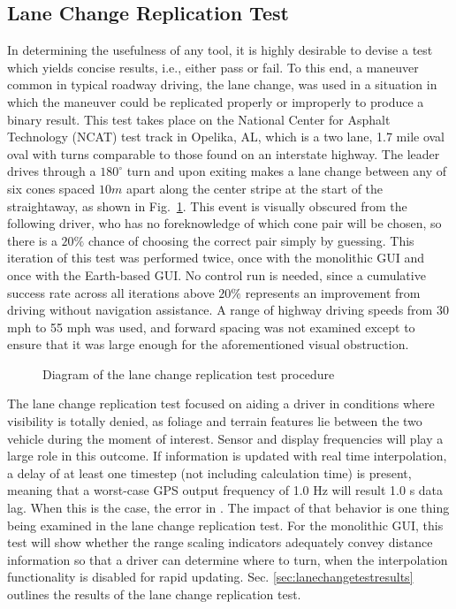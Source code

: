 \subsection{Lane Change Replication Test} \label{sec:lanechangetest}
In determining the usefulness of any tool, it is highly desirable to devise a test which yields concise results, i.e., either pass or fail. To this end, a maneuver common in typical roadway driving, the lane change, was used in a situation in which the maneuver could be replicated properly or improperly to produce a binary result. This test takes place on the National Center for Asphalt Technology (NCAT) test track in Opelika, AL, which is a two lane, 1.7 mile oval oval with turns comparable to those found on an interstate highway. The leader drives through a $180^\circ$ turn and upon exiting makes a lane change between any of six cones spaced $10m$ apart along the center stripe at the start of the straightaway, as shown in Fig.~\ref{fig:lanechangediagram}. This event is visually obscured from the following driver, who has no foreknowledge of which cone pair will be chosen, so there is a $20\%$ chance of choosing the correct pair simply by guessing. This iteration of this test was performed twice, once with the monolithic GUI and once with the Earth-based GUI. No control run is needed, since a cumulative success rate across all iterations above $20\%$ represents an improvement from driving without navigation assistance. A range of highway driving speeds from 30 mph to 55 mph was used, and forward spacing was not examined except to ensure that it was large enough for the aforementioned visual obstruction.

\begin{figure}[ht] \centering
    
    \caption{Diagram of the lane change replication test procedure} \label{fig:lanechangediagram}
\end{figure}

The lane change replication test focused on aiding a driver in conditions where visibility is totally denied, as foliage and terrain features lie between the two vehicle during the moment of interest. Sensor and display frequencies will play a large role in this outcome. If information is updated with real time interpolation, a delay of at least one timestep (not including calculation time) is present, meaning that a worst-case GPS output frequency of 1.0 Hz will result 1.0 s data lag. When this is the case, the error in . The impact of that behavior is one thing being examined in the lane change replication test. For the monolithic GUI, this test will show whether the range scaling indicators adequately convey distance information so that a driver can determine where to turn, when the interpolation functionality is disabled for rapid updating. Sec. \ref{sec:lanechangetestresults} outlines the results of the lane change replication test.


